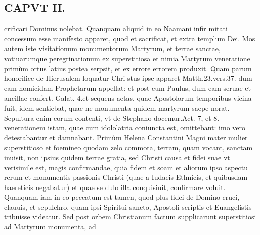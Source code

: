 \documentclass{article}
\begin{document}
\begin{pages}
\section*{CAPVT II. }
\marginpar{[ p.69 ]}\pstart crificari Dominus nolebat. Quanquam aliquid in eo Naamani infir mitati concessum esse manifesto apparet, quod et sacrificat, et extra templum Dei. Mos autem iste visitationum monumentorum Martyrum, et terrae sanctae, votiuarumque peregrinationum ex superstitiosa et nimia Martyrum veneratione primùm ortus latius postea serpsit, et ex errore errorem produxit. Quam parum honorifice de Hierusalem loquatur Chri stus ipse apparet Matth.23.vers.37. dum eam homicidam Prophetarum appellat: et post eum Paulus, dum eam seruae et ancillae confert. Galat. 4.et sequens aetas, quae Apostolorum temporibus vicina fuit, idem sentiebat, quae ne monumenta quidem martyrum saepe norat. Sepultura enim eorum contenti, vt de Stephano docemur.Act. 7, et 8. venerationem istam, quae cum idololatria coniuncta est, omittebant: imo vero detestabantur et damnabant. Primùm Helena Constantini Magni mater mulier superstitioso et foemineo quodam zelo commota, terram, quam vocant, sanctam inuisit, non ipsius quidem terrae gratia, sed Christi causa et fidei suae vt verisimile est, magis confirmandae, quia fidem et soam et aliorum ipso aspectu rerum et monumentis passionis Christi (quae a Iudaeis Ethnicis, et quibusdam haereticis negabatur) et quae se dulo illa conquisiuit, confirmare voluit. Quanquam iam in eo peccatum est tamen, quod plus fidei de Domino cruci, clauuis, et sepulchro, quam ipsi Spiritui sancto, Apostoli scriptis et Euangelistis tribuisse videatur. Sed post orbem Christianum factum supplicarunt superstitiosi ad Martyrum monumenta, ad  \pend

\end{pages}
\end{document}
